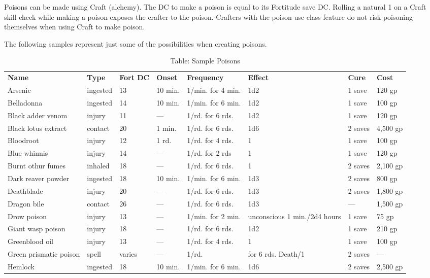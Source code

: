 Poisons can be made using Craft (alchemy). The DC to make a poison is equal to its Fortitude save DC. Rolling a natural 1 on a Craft skill check while making a poison exposes the crafter to the poison. Crafters with the poison use class feature do not risk poisoning themselves when using Craft to make poison.
				
The following samples represent just some of the possibilities when creating poisons.
				

\begin{table*}[]
\sffamily
\caption{Table: Sample Poisons}
\begin{tabular}{llllllll}
\textbf{Name} & \textbf{Type} & \textbf{Fort DC} & \textbf{Onset} & \textbf{Frequency} & \textbf{Effect} & \textbf{Cure} & \textbf{Cost}\\
Arsenic & ingested & 13 & 10 min. & 1/min. for 4 min. & 1d2  & 1 save & 120 gp\\
Belladonna & ingested & 14 & 10 min. & 1/min. for 6 min. & 1d2  & 1 save & 100 gp\\
Black adder venom & injury & 11 & — & 1/rd. for 6 rds. & 1d2  & 1 save & 120 gp\\
Black lotus extract & contact & 20 & 1 min. & 1/rd. for 6 rds. & 1d6  & 2 saves & 4,500 gp\\
Bloodroot & injury & 12 & 1 rd. & 1/rd. for 4 rds. & 1  & 1 save & 100 gp\\
Blue whinnis & injury & 14 & — & 1/rd. for 2 rds &  1  & 1 save & 120 gp\\
Burnt othur fumes & inhaled & 18 & — & 1/rd. for 6 rds. & 1  & 2 saves & 2,100 gp\\
Dark reaver powder & ingested & 18 & 10 min. & 1/min. for 6 min. & 1d3  & 2 saves & 800 gp\\
Deathblade & injury & 20 & — & 1/rd. for 6 rds. & 1d3  & 2 saves & 1,800 gp\\
Dragon bile & contact & 26 & — & 1/rd. for 6 rds. & 1d3  & — & 1,500 gp\\
Drow poison & injury & 13 & — & 1/min. for 2 min. & unconscious 1 min./2d4 hours & 1 save & 75 gp\\
Giant wasp poison & injury & 18 & — & 1/rd. for 6 rds. & 1d2  & 1 save & 210 gp\\
Greenblood oil & injury & 13 & — & 1/rd. for 4 rds. & 1  & 1 save & 100 gp\\
Green prismatic poison & spell & varies & — & 1/rd. & for 6 rds. Death/1  & 2 saves & —\\
Hemlock & ingested & 18 & 10 min. & 1/min. for 6 min. & 1d6  & 2 saves & 2,500 gp\\

\end{tabular}
\end{table*}
